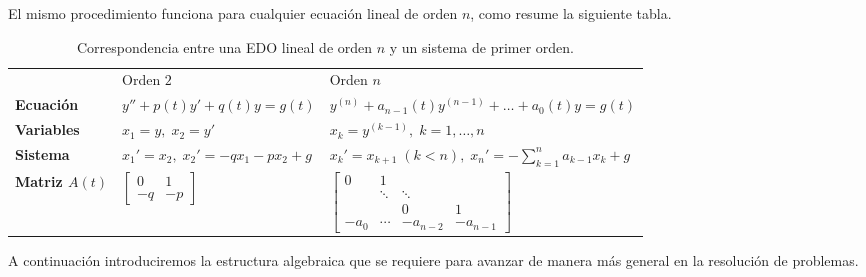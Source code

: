 El mismo procedimiento funciona para cualquier ecuaci\'on lineal de orden $n$, como resume la siguiente tabla.

\begin{table}[H]
\centering
\renewcommand{\arraystretch}{1.5}
\begin{tabular}{>{\bfseries}l l l}
\rowcolor{bbe!15}
 & \textcolor{bbe}{Orden $2$} & \textcolor{bbe}{Orden $n$} \\
Ecuaci\'on & $y''+p(t)y'+q(t)y=g(t)$ & $y^{(n)}+a_{n-1}(t)y^{(n-1)}+\dots+a_0(t)y=g(t)$ \\
Variables & $x_1=y,\; x_2=y'$ & $x_k=y^{(k-1)},\; k=1,\dots,n$ \\
Sistema & $x_1'=x_2,\; x_2'=-qx_1-px_2+g$ & $x_k'=x_{k+1}\;(k<n),\; x_n'=-\sum_{k=1}^{n}a_{k-1}x_k+g$ \\
Matriz $A(t)$ & $\begin{bmatrix}0&1\\-q&-p\end{bmatrix}$ & $\begin{bmatrix}0&1&&\\&\ddots&\ddots&\\&&0&1\\-a_0&\cdots&-a_{n-2}&-a_{n-1}\end{bmatrix}$ \\
\end{tabular}
\caption{Correspondencia entre una EDO lineal de orden $n$ y un sistema de primer orden.}
\end{table}

A continuaci\'on introduciremos la estructura algebraica que se requiere para avanzar de manera m\'as general en la resoluci\'on de problemas.

